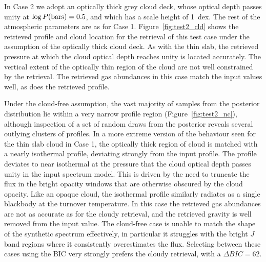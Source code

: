\documentclass[useAMS,usenatbib]{mn2e}
\begin{document}
In Case 2 we adopt an optically thick grey cloud deck, whose optical depth passes unity at $\log P({\rm bars}) = 0.5$, and which has a scale height of 1~dex. The rest of the atmospheric parameters are as for Case 1.  Figure~\ref{fig:test2_cld} shows the retrieved profile and cloud location for the retrieval of this test case under the assumption of the optically thick cloud deck. As with the thin slab, the retrieved pressure at which the cloud optical depth reaches unity is located accurately. The vertical extent of the optically thin region of the cloud are not well constrained by the retrieval. The retrieved gas abundances in this case match the input values well, as does the retrieved profile. 

Under the cloud-free assumption, the vast majority of samples from the posterior distribution lie within a very narrow profile region (Figure~\ref{fig:test2_nc}), although inspection of a set of random draws from the posterior reveals several outlying clusters of profiles. In a more extreme version of the behaviour seen for the thin slab cloud in Case 1, the optically thick region of cloud is matched with a nearly isothermal profile, deviating strongly from the input profile. The profile deviates to near isothermal at the pressure that the cloud optical depth passes unity in the input spectrum model. 
This is driven by the need to truncate the flux in the bright opacity windows that are otherwise obscured by the cloud opacity. Like an opaque cloud, the isothermal profile similarly radiates as a single blackbody at the turnover temperature.
In this case the retrieved gas abundances are not as accurate as for the cloudy retrieval, and the retrieved gravity is well removed from the input value. The cloud-free case is unable to match the shape of the synthetic spectrum effectively, in particular it struggles with the bright $J$ band regions where it consistently overestimates the flux. Selecting between these cases using the BIC very strongly prefers the cloudy retrieval, with a $\Delta BIC = 62$. 
\end{document}
